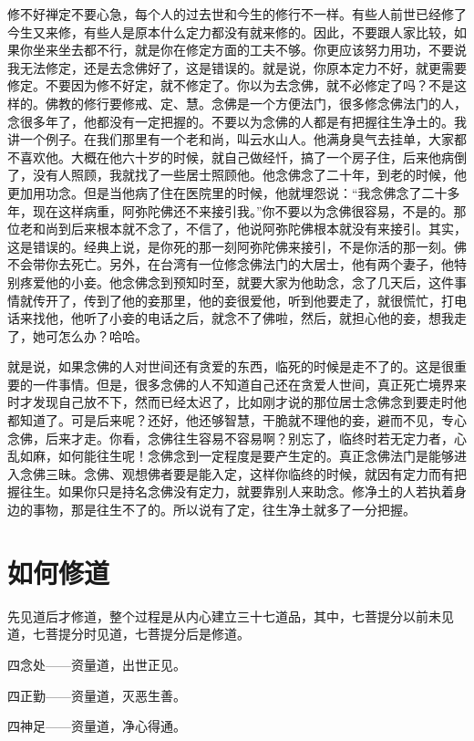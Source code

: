 \documentclass{book}
\begin{document}
修不好禅定不要心急，每个人的过去世和今生的修行不一样。有些人前世已经修了今生又来修，有些人是原本什么定力都没有就来修的。因此，不要跟人家比较，如果你坐来坐去都不行，就是你在修定方面的工夫不够。你更应该努力用功，不要说我无法修定，还是去念佛好了，这是错误的。就是说，你原本定力不好，就更需要修定。不要因为修不好定，就不修定了。你以为去念佛，就不必修定了吗？不是这样的。佛教的修行要修戒、定、慧。念佛是一个方便法门，很多修念佛法门的人，念很多年了，他都没有一定把握的。不要以为念佛的人都是有把握往生净土的。我讲一个例子。在我们那里有一个老和尚，叫云水山人。他满身臭气去挂单，大家都不喜欢他。大概在他六十岁的时候，就自己做经忏，搞了一个房子住，后来他病倒了，没有人照顾，我就找了一些居士照顾他。他念佛念了二十年，到老的时候，他更加用功念。但是当他病了住在医院里的时候，他就埋怨说：``我念佛念了二十多年，现在这样病重，阿弥陀佛还不来接引我。''你不要以为念佛很容易，不是的。那位老和尚到后来根本就不念了，不信了，他说阿弥陀佛根本就没有来接引。其实，这是错误的。经典上说，是你死的那一刻阿弥陀佛来接引，不是你活的那一刻。佛不会带你去死亡。另外，在台湾有一位修念佛法门的大居士，他有两个妻子，他特别疼爱他的小妾。他念佛念到预知时至，就要大家为他助念，念了几天后，这件事情就传开了，传到了他的妾那里，他的妾很爱他，听到他要走了，就很慌忙，打电话来找他，他听了小妾的电话之后，就念不了佛啦，然后，就担心他的妾，想我走了，她可怎么办？哈哈。

就是说，如果念佛的人对世间还有贪爱的东西，临死的时候是走不了的。这是很重要的一件事情。但是，很多念佛的人不知道自己还在贪爱人世间，真正死亡境界来时才发现自己放不下，然而已经太迟了，比如刚才说的那位居士念佛念到要走时他都知道了。可是后来呢？还好，他还够智慧，干脆就不理他的妾，避而不见，专心念佛，后来才走。你看，念佛往生容易不容易啊？别忘了，临终时若无定力者，心乱如麻，如何能往生呢！念佛念到一定程度是要产生定的。真正念佛法门是能够进入念佛三昧。念佛、观想佛者要是能入定，这样你临终的时候，就因有定力而有把握往生。如果你只是持名念佛没有定力，就要靠别人来助念。修净土的人若执着身边的事物，那是往生不了的。所以说有了定，往生净土就多了一分把握。

\section{如何修道}

先见道后才修道，整个过程是从内心建立三十七道品，其中，七菩提分以前未见道，七菩提分时见道，七菩提分后是修道。

四念处——资量道，出世正见。

四正勤——资量道，灭恶生善。

四神足——资量道，净心得通。
\end{document}
